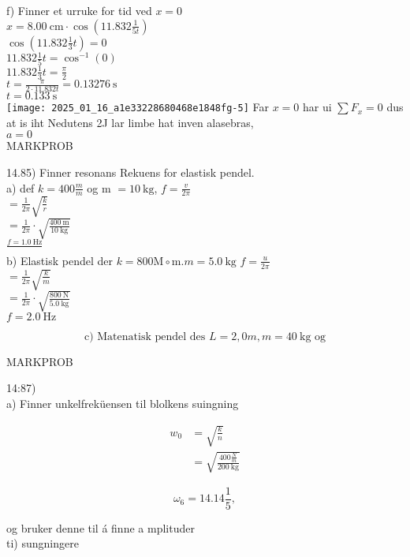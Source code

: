 \documentclass[10pt]{article}
\begin{document}
f) Finner et urruke for tid ved $x=0$\\
$x=8.00 \mathrm{~cm} \cdot \cos \left(11.832 \frac{1}{5 t}\right)$\\
$\cos \left(11.832 \frac{1}{3} t\right)=0$\\
$11.832 \frac{1}{5} t=\cos ^{-1}(0)$\\
$11.832 \frac{1}{3} t=\frac{\pi}{2}$\\
$t=\frac{\pi}{2 \cdot 11.832 t}=0.13276 \mathrm{~s}$\\
$t=0.133 \mathrm{~s}$\\
\texttt{[image: 2025\_01\_16\_a1e33228680468e1848fg-5]} Far $x=0$ har ui $\sum F_{x}=0$ dus at is iht Nedutens 2J lar limbe hat inven alasebras,\\
$a=0$\\

MARKPROB

14.85) Finner resonans Rekuens for elastisk pendel.\\
a) def $k=400 \frac{m}{m}$ og m $=10 \mathrm{~kg}$, $f=\frac{v}{2 \pi}$\\
$=\frac{1}{2 \pi} \sqrt{\frac{k}{r}}$\\
$=\frac{1}{2 \pi} \cdot \sqrt{\frac{400 \mathrm{~m}}{10 \mathrm{~kg}}}$\\
$\frac{f=1.0 \mathrm{~Hz}}{}$\\
b) Elastisk pendel der $k=800 \mathrm{M} \circ \mathrm{m} . m=5.0 \mathrm{~kg}$ $f=\frac{u}{2 \pi}$\\
$=\frac{1}{2 \pi} \sqrt{\frac{k}{m}}$\\
$=\frac{1}{2 \pi} \cdot \sqrt{\frac{800 \mathrm{~N}}{5.0 \mathrm{~kg}}}$\\
$f=2.0 \mathrm{~Hz}$

$$
\text { c) Matenatisk pendel des } L=2,0 m, m=40 \mathrm{~kg} \text { og }
$$

MARKPROB

14:87)\\
a) Finner unkelfreküensen til blolkens suingning

$$
\begin{aligned}
w_{0} & =\sqrt{\frac{k}{n}} \\
& =\sqrt{\frac{400 \frac{N}{m}}{200 \mathrm{~kg}}}
\end{aligned}
$$

$$
\omega_{6}=14.14 \frac{1}{5},
$$

og bruker denne til á finne a mplituder\\
ti) sungningere
\end{document}
